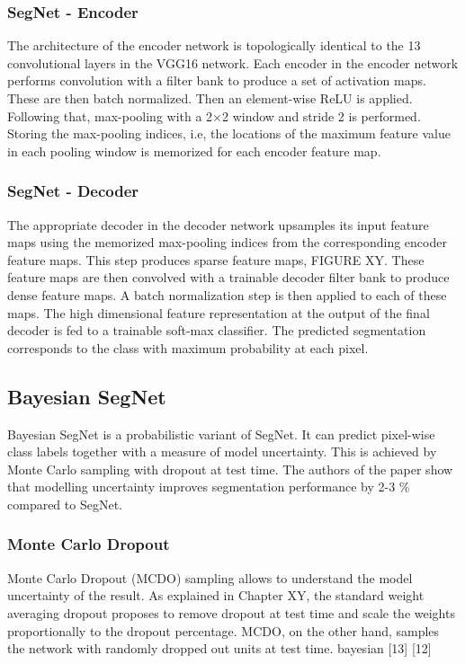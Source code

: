 \subsubsection{SegNet - Encoder}

The architecture of the encoder network is topologically identical to the 13 convolutional layers in the VGG16 network. Each encoder in the encoder network performs convolution with a filter bank to produce a set of activation maps. These are then batch normalized. Then an element-wise ReLU is applied. Following that, max-pooling with a 2×2 window and stride 2 is performed. Storing the max-pooling indices, i.e, the locations of the maximum feature value in each pooling window is memorized for each encoder feature map.

\subsubsection{SegNet - Decoder}

The appropriate decoder in the decoder network upsamples its input feature maps using the memorized max-pooling indices from the corresponding encoder feature maps. This step produces sparse feature maps, FIGURE XY. These feature maps are then convolved with a trainable decoder filter bank to produce dense feature maps. A batch normalization step is then applied to each of these maps. The high dimensional feature representation at the output of the final decoder is fed to a trainable soft-max classifier. The predicted segmentation corresponds to the class with maximum probability at each pixel.

\subsection{Bayesian SegNet}

Bayesian SegNet is a probabilistic variant of SegNet. It can predict pixel-wise class labels together with a measure of model uncertainty.  This is achieved by Monte Carlo sampling with dropout at test time. The authors of the paper show that modelling uncertainty improves segmentation performance by 2-3 \% compared to SegNet.

\subsubsection{Monte Carlo Dropout}

Monte Carlo Dropout (MCDO) sampling allows to understand the model uncertainty of the result. As explained in Chapter XY, the standard weight averaging dropout proposes to remove dropout at test time and scale the weights proportionally to the dropout percentage. MCDO, on the other hand, samples the network with randomly dropped out units at test time. bayesian [13] [12]

